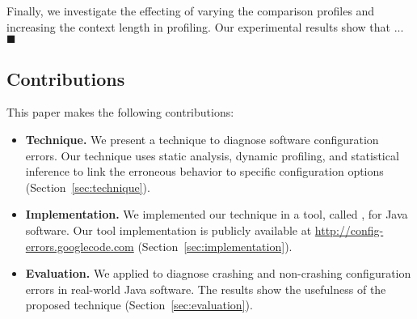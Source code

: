 Finally, we investigate the effecting of varying the comparison profiles
and increasing the context length in profiling. Our experimental results
show that ... $\blacksquare$






\subsection{Contributions}
This paper makes the following contributions:

\begin{itemize}

\item \textbf{Technique.} We present a technique to diagnose
software configuration errors. Our technique uses static analysis,
dynamic profiling, and statistical inference to link the
erroneous behavior to specific configuration options (Section~\ref{sec:technique}).


\item \textbf{Implementation.} We implemented our technique 
in a tool, called \ourtool, for Java software. Our tool implementation is publicly available at
\url{http://config-errors.googlecode.com} (Section~\ref{sec:implementation}).


\item \textbf{Evaluation.} We applied \ourtool to diagnose
\errors crashing and non-crashing configuration errors in \subjectnum
real-world Java software. The results
show the usefulness of the proposed technique (Section~\ref{sec:evaluation}).

\end{itemize}



